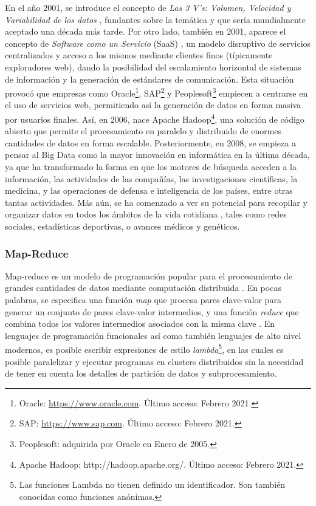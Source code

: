 \bigskip En el año 2001, se introduce el concepto de \textit{Las 3 V’s: Volumen, Velocidad y Variabilidad de los datos} \citep{laney20013d}, fundantes sobre la temática y que sería mundialmente aceptado una década más tarde. Por otro lado, también en 2001, aparece el concepto de \textit{Software como un Servicio} (SaaS) \citep{hoch2001software}, un modelo disruptivo de servicios centralizados y acceso a los mismos mediante clientes finos (típicamente exploradores web), dando la posibilidad del escalamiento horizontal de sistemas de información y la generación de estándares de comunicación. Esta situación provocó que empresas como Oracle\footnote{Oracle: \url{https://www.oracle.com}. Último acceso: Febrero 2021.}, SAP\footnote{SAP: \url{https://www.sap.com}. Último acceso: Febrero 2021.} y Peoplesoft\footnote{Peoplesoft: adquirida por Oracle en Enero de 2005.} empiecen a centrarse en el uso de servicios web, permitiendo así la generación de datos en forma masiva por usuarios finales. Así, en 2006, nace Apache Hadoop\footnote{Apache Hadoop: http://hadoop.apache.org/. Último acceso: Febrero 2021.}, una solución de código abierto que permite el procesamiento en paralelo y distribuido de enormes cantidades de datos en forma escalable. Posteriormente, en 2008, se empieza a pensar al Big Data como la mayor innovación en informática en la última década, ya que ha transformado la forma en que los motores de búsqueda acceden a la información, las actividades de las compañías, las investigaciones científicas, la medicina, y las operaciones de defensa e inteligencia de los países, entre otras tantas actividades. Más aún, se ha comenzado a ver su potencial para recopilar y organizar datos en todos los ámbitos de la vida cotidiana \citep{bryant2008big}, tales como redes sociales, estadísticas deportivas, o avances médicos y genéticos.

\subsubsection{Map-Reduce}
Map-reduce es un modelo de programación popular para el procesamiento de grandes cantidades de datos mediante computación distribuida \citep{condie2010mapreduce}.  En pocas palabras, se especifica una función \textit{map} que procesa pares clave-valor para generar un conjunto de pares clave-valor intermedios, y una función \textit{reduce} que combina todos los valores intermedios asociados con la misma clave \citep{dean2008mapreduce}. En lenguajes de programación funcionales así como también lenguajes de alto nivel modernos, es posible escribir expresiones de estilo \textit{lambda}\footnote{Las funciones Lambda no tienen definido un identificador. Son también conocidas como funciones anónimas.}, en las cuales es posible paralelizar y ejecutar programas en clusters distribuidos sin la necesidad de tener en cuenta los detalles de partición de datos y subprocesamiento.


